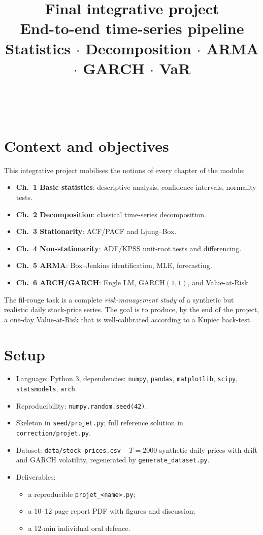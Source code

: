 \documentclass[a4paper,11pt]{article}
\title{Final integrative project\\[2pt]
\large End-to-end time-series pipeline\\
\large Statistics $\cdot$ Decomposition $\cdot$ ARMA $\cdot$ GARCH $\cdot$ VaR}
\author{\auteurNom\\\auteurEmail\\\auteurInstitution}
\date{\anneeUniversitaire}
\begin{document}
\maketitle

\section*{Context and objectives}

This integrative project mobilises the notions of every chapter of
the module:
\begin{itemize}
  \item \textbf{Ch.~1 Basic statistics}: descriptive analysis,
        confidence intervals, normality tests.
  \item \textbf{Ch.~2 Decomposition}: classical time-series
        decomposition.
  \item \textbf{Ch.~3 Stationarity}: ACF/PACF and Ljung--Box.
  \item \textbf{Ch.~4 Non-stationarity}: ADF/KPSS unit-root tests
        and differencing.
  \item \textbf{Ch.~5 ARMA}: Box--Jenkins identification, MLE,
        forecasting.
  \item \textbf{Ch.~6 ARCH/GARCH}: Engle LM, GARCH$(1, 1)$, and
        Value-at-Risk.
\end{itemize}

\noindent
The fil-rouge task is a complete \emph{risk-management study} of a
synthetic but realistic daily stock-price series. The goal is to
produce, by the end of the project, a one-day Value-at-Risk that is
well-calibrated according to a Kupiec back-test.

\section*{Setup}
\begin{itemize}
  \item Language: Python 3, dependencies: \texttt{numpy},
        \texttt{pandas}, \texttt{matplotlib}, \texttt{scipy},
        \texttt{statsmodels}, \texttt{arch}.
  \item Reproducibility: \texttt{numpy.random.seed(42)}.
  \item Skeleton in \texttt{seed/projet.py}; full reference
        solution in \texttt{correction/projet.py}.
  \item Dataset: \texttt{data/stock\_prices.csv} -- $T = 2000$
        synthetic daily prices with drift and GARCH volatility,
        regenerated by \texttt{generate\_dataset.py}.
  \item Deliverables:
    \begin{itemize}
      \item a reproducible \texttt{projet\_<name>.py};
      \item a 10--12 page report PDF with figures and discussion;
      \item a 12-min individual oral defence.
    \end{itemize}
\end{itemize}
\end{document}
